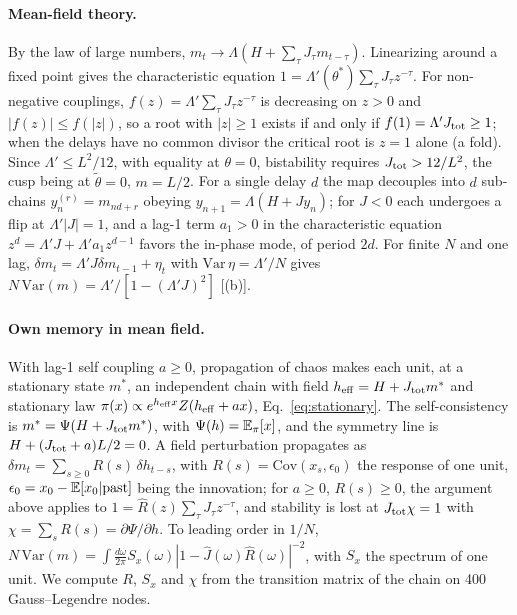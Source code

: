 \paragraph{Mean-field theory.} By the law of large numbers, $m_t\to\Lambda(H+\sum_\tau J_\tau m_{t-\tau})$. Linearizing around a fixed point gives the characteristic equation $1=\Lambda'(\theta^*)\sum_\tau J_\tau z^{-\tau}$. For non-negative couplings, $f(z)=\Lambda'\sum_\tau J_\tau z^{-\tau}$ is decreasing on $z>0$ and $|f(z)|\le f(|z|)$, so a root with $|z|\ge1$ exists if and only if $f(1)=\Lambda'J_{\rm tot}\ge1$; when the delays have no common divisor the critical root is $z=1$ alone (a fold). Since $\Lambda'\le L^2/12$, with equality at $\theta=0$, bistability requires $J_{\rm tot}>12/L^2$, the cusp being at $\tilde\theta=0$, $m=L/2$. For a single delay $d$ the map decouples into $d$ sub-chains $y^{(r)}_n=m_{nd+r}$ obeying $y_{n+1}=\Lambda(H+Jy_n)$; for $J<0$ each undergoes a flip at $\Lambda'|J|=1$, and a lag-1 term $a_1>0$ in the characteristic equation $z^d=\Lambda'J+\Lambda'a_1z^{d-1}$ favors the in-phase mode, of period $2d$. For finite $N$ and one lag, $\delta m_t=\Lambda'J\delta m_{t-1}+\eta_t$ with $\mathrm{Var}\,\eta=\Lambda'/N$ gives $N\,\mathrm{Var}(m)=\Lambda'/[1-(\Lambda'J)^2]$ [(b)].

\paragraph{Own memory in mean field.} With lag-1 self coupling $a\ge0$, propagation of chaos makes each unit, at a stationary state $m^*$, an independent chain with field $h_{\rm eff}=H+J_{\rm tot}m^*$ and stationary law $\pi(x)\propto e^{h_{\rm eff}x}Z(h_{\rm eff}+ax)$, Eq.~\eqref{eq:stationary}. The self-consistency is $m^*=\Psi(H+J_{\rm tot}m^*)$, with $\Psi(h)=\mathbb{E}_\pi[x]$, and the symmetry line is $H+(J_{\rm tot}+a)L/2=0$. A field perturbation propagates as $\delta m_t=\sum_{s\ge0}R(s)\,\delta h_{t-s}$, with $R(s)=\mathrm{Cov}(x_s,\epsilon_0)$ the response of one unit, $\epsilon_0=x_0-\mathbb{E}[x_0|\text{past}]$ being the innovation; for $a\ge0$, $R(s)\ge0$, the argument above applies to $1=\hat R(z)\sum_\tau J_\tau z^{-\tau}$, and stability is lost at $J_{\rm tot}\chi=1$ with $\chi=\sum_sR(s)=\partial\Psi/\partial h$. To leading order in $1/N$, $N\,\mathrm{Var}(m)=\int\frac{d\omega}{2\pi}S_x(\omega)|1-\hat J(\omega)\hat R(\omega)|^{-2}$, with $S_x$ the spectrum of one unit. We compute $R$, $S_x$ and $\chi$ from the transition matrix of the chain on 400 Gauss--Legendre nodes.


